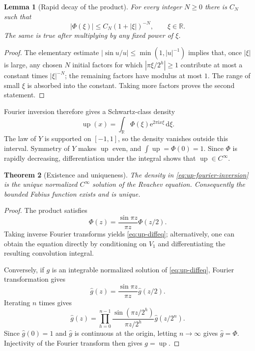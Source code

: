 \documentclass[11pt]{article}
\numberwithin{equation}{section}
\newtheorem{theorem}{Theorem}[section]
\newtheorem{lemma}[theorem]{Lemma}
\theoremstyle{definition}
\theoremstyle{remark}
\newcommand{\R}{\mathbb{R}}
\newcommand{\dd}{\,\mathrm{d}}
\newcommand{\e}{\mathrm{e}}
\newcommand{\ii}{\mathrm{i}}
\newcommand{\upf}{\operatorname{up}}
\begin{document}
\begin{lemma}[Rapid decay of the product]\label{lem:rapid-product}
For every integer $N\ge0$ there is $C_N$ such that
\[
 |\Phi(\xi)|\le C_N(1+|\xi|)^{-N},\qquad \xi\in\R.
\]
The same is true after multiplying by any fixed power of $\xi$.
\end{lemma}

\begin{proof}
The elementary estimate $|\sin u/u|\le\min(1,|u|^{-1})$ implies that, once
$|\xi|$ is large, any chosen $N$ initial factors for which
$|\pi\xi/2^h|\ge1$ contribute at most a constant times $|\xi|^{-N}$; the
remaining factors have modulus at most $1$.  The range of small $\xi$ is
absorbed into the constant.  Taking more factors proves the second statement.
\end{proof}

Fourier inversion therefore gives a Schwartz-class density
\begin{equation}\label{eq:up-fourier-inversion}
 \upf(x)=\int_{\R}\Phi(\xi)\e^{2\pi\ii x\xi}\dd\xi.
\end{equation}
The law of $Y$ is supported on $[-1,1]$, so the density vanishes outside this
interval.  Symmetry of $Y$ makes $\upf$ even, and $\int\upf=\Phi(0)=1$.
Since $\Phi$ is rapidly decreasing, differentiation under the integral shows
that $\upf\in C^\infty$.

\begin{theorem}[Existence and uniqueness]\label{thm:existence-uniqueness}
The density in \eqref{eq:up-fourier-inversion} is the unique normalized
$C^\infty$ solution of the Rvachev equation.  Consequently the bounded Fabius
function exists and is unique.
\end{theorem}

\begin{proof}
The product satisfies
\begin{equation}\label{eq:fourier-refinement}
 \Phi(z)=\frac{\sin\pi z}{\pi z}\Phi(z/2).
\end{equation}
Taking inverse Fourier transforms yields \eqref{eq:up-diffeq}; alternatively,
one can obtain the equation directly by conditioning on $V_1$ and
differentiating the resulting convolution integral.

Conversely, if $g$ is an integrable normalized solution of
\eqref{eq:up-diffeq}, Fourier transformation gives
\[
 \widehat g(z)=\frac{\sin\pi z}{\pi z}\widehat g(z/2).
\]
Iterating $n$ times gives
\[
 \widehat g(z)=\prod_{h=0}^{n-1}\frac{\sin(\pi z/2^h)}{\pi z/2^h}
                \widehat g(z/2^n).
\]
Since $\widehat g(0)=1$ and $\widehat g$ is continuous at the origin, letting
$n\to\infty$ gives $\widehat g=\Phi$.  Injectivity of the Fourier transform
then gives $g=\upf$.
\end{proof}
\end{document}
